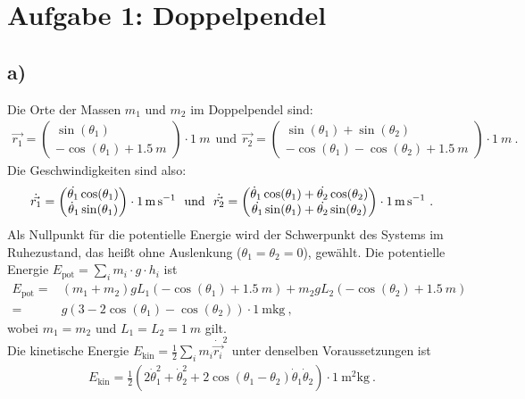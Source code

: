 
\section*{Aufgabe 1: Doppelpendel}
\subsection*{a)}
Die Orte der Massen $m_1$ und $m_2$ im Doppelpendel sind:
\begin{align}
\vec{r_1}=\begin{pmatrix}\sin(\theta_1)\\-\cos(\theta_1)+\SI{1,5}{m}\end{pmatrix}
\cdot\SI{1}{m}~~\text{und}~~
\vec{r_2}=\begin{pmatrix}\sin(\theta_1)+\sin(\theta_2)\\-\cos(\theta_1)-\cos(\theta_2)+\SI{1,5}{m}\end{pmatrix}\cdot\SI{1}{m}~.
\end{align}
Die Geschwindigkeiten sind also:
\begin{align}
\dot{\vec{r_1}}=\begin{pmatrix}\dot{\theta_1}\cos(\theta_1)\\\dot\theta_1\sin(\theta_1)\end{pmatrix}\cdot\SI{1}{\meter\per\second}
~~\text{und}~~
\dot{\vec{r_2}}=\begin{pmatrix}\dot\theta_1\cos(\theta_1)+\dot{\theta_2}\cos(\theta_2)\\\-\dot{\theta_1}\sin(\theta_1)+\dot{\theta_2}\sin(\theta_2)\end{pmatrix}\cdot\SI{1}{\meter\per\second}~.
\end{align}
Als Nullpunkt für die potentielle Energie wird der Schwerpunkt des Systems im Ruhezustand, das heißt ohne Auslenkung ($\theta_1=\theta_2=0$), gewählt.
Die potentielle Energie $E_\text{pot}=\sum\limits_{i}m_i\cdot g\cdot h_i$ ist
\begin{align}
E_\text{pot}=&(m_1+m_2)gL_1\left(-\cos(\theta_1)+\SI{1,5}{m}\right)+m_2gL_2\left(-\cos(\theta_2)+\SI{1,5}{m}\right)\\
=&g(3-2\cos(\theta_1)-\cos(\theta_2))\cdot\SI{1}{\meter\kilogram}~,
\end{align}
wobei $m_1=m_2$ und $L_1=L_2=\SI{1}{m}$ gilt.\\
Die kinetische Energie $E_\text{kin}=\frac{1}{2}\sum\limits_{i}m_i{\dot{\vec{r_i}}}^2$ unter denselben Voraussetzungen ist
\begin{align}
E_\text{kin}=\frac{1}{2}\left(2\dot\theta_1^2+\dot\theta_2^2+2\cos(\theta_1-\theta_2)\dot\theta_1\dot\theta_2\right)\cdot\SI{1}{\square\meter\kilogram}~.
\end{align}

